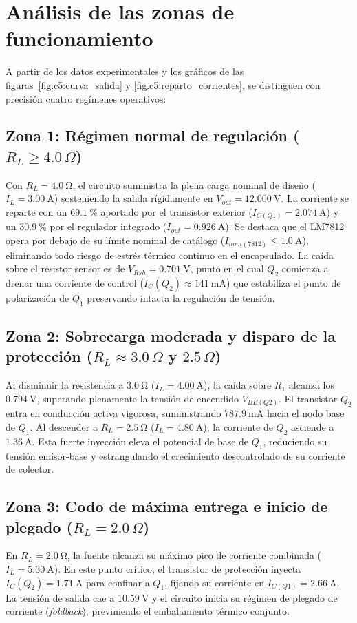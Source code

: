 \section{Análisis de las zonas de funcionamiento}
\label{sec.c5:analisis_zonas}

A partir de los datos experimentales y los gráficos de las figuras~\ref{fig.c5:curva_salida} y
\ref{fig.c5:reparto_corrientes}, se distinguen con precisión cuatro regímenes operativos:

\subsection{Zona 1: Régimen normal de regulación ($R_L \ge 4.0\,\Omega$)}
Con $R_L = \SI{4.0}{\ohm}$, el circuito suministra la plena carga nominal de diseño ($I_L = \SI{3.00}{\ampere}$)
sosteniendo la salida rígidamente en $V_{out} = \SI{12.000}{\volt}$. La corriente se reparte con un
$\SI{69.1}{\percent}$ aportado por el transistor exterior ($I_{C(Q1)} = \SI{2.074}{\ampere}$) y un $\SI{30.9}{\percent}$
por el regulador integrado ($I_{out} = \SI{0.926}{\ampere}$). Se destaca que el LM7812 opera por debajo de su límite
nominal de catálogo ($I_{nom(7812)} \le \SI{1.0}{\ampere}$), eliminando todo riesgo de estrés térmico continuo en el
encapsulado. La caída sobre el resistor sensor es de $V_{Rsh} = \SI{0.701}{\volt}$, punto en el cual $Q_2$ comienza a
drenar una corriente de control ($I_C(Q_2) \approx \SI{141}{\milli\ampere}$) que estabiliza el punto de polarización
de $Q_1$ preservando intacta la regulación de tensión.

\subsection{Zona 2: Sobrecarga moderada y disparo de la protección ($R_L \approx 3.0\,\Omega$ y $2.5\,\Omega$)}
Al disminuir la resistencia a $\SI{3.0}{\ohm}$ ($I_L = \SI{4.00}{\ampere}$), la caída sobre $R_1$ alcanza los
$\SI{0.794}{\volt}$, superando plenamente la tensión de encendido $V_{BE(Q2)}$. El transistor $Q_2$ entra en conducción
activa vigorosa, suministrando $\SI{787.9}{\milli\ampere}$ hacia el nodo base de $Q_1$. Al descender a $R_L = \SI{2.5}{\ohm}$
($I_L = \SI{4.80}{\ampere}$), la corriente de $Q_2$ asciende a $\SI{1.36}{\ampere}$. Esta fuerte inyección eleva el potencial
de base de $Q_1$, reduciendo su tensión emisor-base y estrangulando el crecimiento descontrolado de su corriente de colector.

\subsection{Zona 3: Codo de máxima entrega e inicio de plegado ($R_L = 2.0\,\Omega$)}
En $R_L = \SI{2.0}{\ohm}$, la fuente alcanza su máximo pico de corriente combinada ($I_L = \SI{5.30}{\ampere}$).
En este punto crítico, el transistor de protección inyecta $I_C(Q_2) = \SI{1.71}{\ampere}$ para confinar a $Q_1$,
fijando su corriente en $I_{C(Q1)} = \SI{2.66}{\ampere}$. La tensión de salida cae a $\SI{10.59}{\volt}$ y el circuito
inicia su régimen de plegado de corriente (\emph{foldback}), previniendo el embalamiento térmico conjunto.

